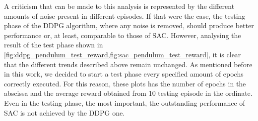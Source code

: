 A criticism that can be made to this analysis is represented by the different amounts of noise present in different episodes.
If that were the case, the testing phase of the DDPG algorithm, where any noise is removed, should produce better performance or, at least, comparable to those of SAC.
However, analysing the result of the test phase shown in \vref{fig:ddpg_pendulum_test_reward,fig:sac_pendulum_test_reward}, it is clear that the different trends described above remain unchanged.
As mentioned before in this work, we decided to start a test phase every specified amount of epochs correctly executed.
For this reason, these plots has the number of epochs in the abscissa and the average reward obtained from 10 testing episode in the ordinate.
Even in the testing phase, the most important, the outstanding performance of SAC is not achieved by the DDPG one.


